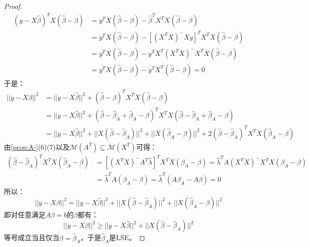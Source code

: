 \begin{proof}
\begin{align*}
		(y-X\hat{\beta})^TX(\hat{\beta}-\beta)&=y^TX(\hat{\beta}-\beta)-\hat{\beta}^TX^TX(\hat{\beta}-\beta) \\
		&=y^TX(\hat{\beta}-\beta)-[(X^TX)^-Xy]^TX^TX(\hat{\beta}-\beta) \\
		&=y^TX(\hat{\beta}-\beta)-y^TX^T(X^TX)^-X^TX(\hat{\beta}-\beta) \\
		&=y^TX(\hat{\beta}-\beta)-y^TX^T(\hat{\beta}-\beta)=0
	\end{align*}
	于是：
	\begin{align*}
		||y-X\beta||^2
		&=||y-X\hat{\beta}||^2+(\hat{\beta}-\beta)^TX^TX(\hat{\beta}-\beta) \\
		&=||y-X\hat{\beta}||^2+(\hat{\beta}-\hat{\beta}_A+\hat{\beta}_A-\beta)^TX^TX(\hat{\beta}-\hat{\beta}_A+\hat{\beta}_A-\beta) \\
		&=||y-X\hat{\beta}||^2+||X(\hat{\beta}-\hat{\beta}_A)||^2+||X(\hat{\beta}_A-\beta)||^2+2(\hat{\beta}-\hat{\beta}_A)^TX^TX(\hat{\beta}_A-\beta)
	\end{align*}
	由\cref{prop:A-}(6)(7)以及$\mathcal{M}(A^T)\subseteq\mathcal{M}(X^T)$可得：
	\begin{align*}
		(\hat{\beta}-\hat{\beta}_A)^TX^TX(\hat{\beta}_A-\beta)
		&=[(X^TX)^-A^T\hat{\lambda}]^TX^TX(\beta_A-\beta)
		=\hat{\lambda}^TA(X^TX)^-X^TX(\beta_A-\beta) \\
		&=\hat{\lambda}^TA(\beta_A-\beta)
		=\hat{\lambda}^T(A\beta_A-A\beta)=0
	\end{align*}
	所以：
	\begin{equation*}
		||y-X\beta||^2=||y-X\hat{\beta}||^2+||X(\hat{\beta}-\hat{\beta}_A)||^2+||X(\hat{\beta}_A-\beta)||^2
	\end{equation*}
	即对任意满足$A\beta=b$的$\beta$都有：
	\begin{equation*}
		||y-X\beta||^2\geqslant||y-X\hat{\beta}||^2+||X(\hat{\beta}-\hat{\beta}_A)||^2
	\end{equation*}
	等号成立当且仅当$\beta=\hat{\beta}_A$，于是$\hat{\beta}_A$是LSE。
\end{proof}
